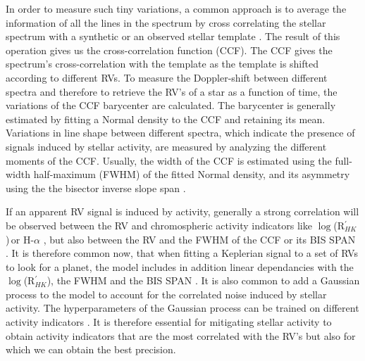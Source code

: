 \documentclass{aa}
\def\logrhk{$\log$(R$^{\prime}_{HK}$)}
\begin{document}
In order to measure such tiny variations, a common approach is to average the information of all the lines in the spectrum by cross correlating the stellar spectrum with a synthetic \citep[][]{Baranne-1996,Pepe-2002a} or an observed stellar template \citep[][]{Anglada-Escude-2012}. The result of this operation gives us the cross-correlation function (CCF).  The CCF gives the spectrum's cross-correlation with the template as the template is shifted according to different RVs.
%
To measure the Doppler-shift between different spectra and therefore to retrieve the RV's of a star as a function of time, the variations of the CCF barycenter are calculated. 
The barycenter is generally estimated by fitting a Normal density to the CCF and retaining its mean. Variations in line shape between different spectra, which indicate the presence of signals induced by stellar activity, are measured by analyzing the different moments of the CCF. Usually, the width of the CCF is estimated using the full-width half-maximum (FWHM) of the fitted Normal density, and its asymmetry using the the bisector inverse slope span \citep[BIS SPAN,][]{Queloz-2001}.


If an apparent RV signal is induced by activity, generally a strong correlation will be observed between the RV and chromospheric activity indicators like \logrhk\,or H-$\alpha$ \citep{Boisse-2009,Dumusque-2012,Robertson-2014}, but also between the RV and the FWHM of the CCF or its BIS SPAN \citep[][]{Queloz-2001,Boisse-2009,Queloz-2009,Dumusque-2016a}. 
%
It is therefore common now, that when fitting a Keplerian signal to a set of RVs to look for a planet, the model includes in addition linear dependancies with the \logrhk, the FWHM and the BIS SPAN \citep{Dumusque:2017aa,Feng:2017aa}.
%
It is also common to add a Gaussian process to the model to account for the correlated noise induced by stellar activity. The hyperparameters of the Gaussian process can be trained on different activity indicators \citep{Haywood-2014,Rajpaul-2015}. It is therefore essential for mitigating stellar activity to obtain activity indicators that are the most correlated with the RV's but also for which we can obtain the best precision.
\end{document}
